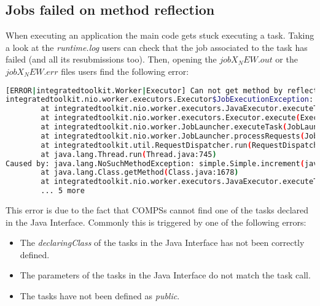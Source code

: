 
\subsection{Jobs failed on method reflection}
When executing an application the main code gets stuck executing a task. Taking a look at the \textit{runtime.log} users can check
that the job associated to the task has failed (and all its resubmissions too). Then, opening the \textit{$jobX_NEW.out$} or the
\textit{$jobX_NEW.err$} files users find the following error:

\begin{lstlisting}[language=bash]
[ERROR|integratedtoolkit.Worker|Executor] Can not get method by reflection
integratedtoolkit.nio.worker.executors.Executor$JobExecutionException: Can not get method by reflection
        at integratedtoolkit.nio.worker.executors.JavaExecutor.executeTask(JavaExecutor.java:142)
        at integratedtoolkit.nio.worker.executors.Executor.execute(Executor.java:42)
        at integratedtoolkit.nio.worker.JobLauncher.executeTask(JobLauncher.java:46)
        at integratedtoolkit.nio.worker.JobLauncher.processRequests(JobLauncher.java:34)
        at integratedtoolkit.util.RequestDispatcher.run(RequestDispatcher.java:46)
        at java.lang.Thread.run(Thread.java:745)
Caused by: java.lang.NoSuchMethodException: simple.Simple.increment(java.lang.String)
        at java.lang.Class.getMethod(Class.java:1678)
        at integratedtoolkit.nio.worker.executors.JavaExecutor.executeTask(JavaExecutor.java:140)
        ... 5 more
\end{lstlisting}

This error is due to the fact that COMPSs cannot find one of the tasks declared in the Java Interface. Commonly this is triggered by
one of the following errors:

\begin{itemize}
 \item The \textit{declaringClass} of the tasks in the Java Interface has not been correctly defined.
 \item The parameters of the tasks in the Java Interface do not match the task call.
 \item The tasks have not been defined as \textit{public}.
\end{itemize}

